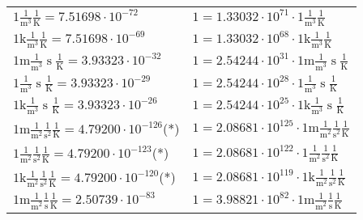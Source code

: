 \begin{center}
\begin{longtable}{l l}
{\color{black}$1 \bm{\mathrm{ }}\frac1{\operatorname{m}^3}{}{}\frac1{\operatorname{K}} = 7.51698\cdot10^{-72} $}   & {\color{black}$ 1 = 1.33032\cdot10^{71} \cdot 1 \bm{\mathrm{ }}\frac1{\operatorname{m}^3}{}{}\frac1{\operatorname{K}}$}  \\
{\color{gray}$1 \bm{\mathrm{ k}}\frac1{\operatorname{m}^3}{}{}\frac1{\operatorname{K}} = 7.51698\cdot10^{-69} $}   & {\color{gray}$ 1 = 1.33032\cdot10^{68} \cdot 1 \bm{\mathrm{ k}}\frac1{\operatorname{m}^3}{}{}\frac1{\operatorname{K}}$}  \\
{\color{gray}$1 \bm{\mathrm{ m}}\frac1{\operatorname{m}^3}{\operatorname{s}}{}\frac1{\operatorname{K}} = 3.93323\cdot10^{-32} $}   & {\color{gray}$ 1 = 2.54244\cdot10^{31} \cdot 1 \bm{\mathrm{ m}}\frac1{\operatorname{m}^3}{\operatorname{s}}{}\frac1{\operatorname{K}}$}  \\
{\color{black}$1 \bm{\mathrm{ }}\frac1{\operatorname{m}^3}{\operatorname{s}}{}\frac1{\operatorname{K}} = 3.93323\cdot10^{-29} $}   & {\color{black}$ 1 = 2.54244\cdot10^{28} \cdot 1 \bm{\mathrm{ }}\frac1{\operatorname{m}^3}{\operatorname{s}}{}\frac1{\operatorname{K}}$}  \\
{\color{gray}$1 \bm{\mathrm{ k}}\frac1{\operatorname{m}^3}{\operatorname{s}}{}\frac1{\operatorname{K}} = 3.93323\cdot10^{-26} $}   & {\color{gray}$ 1 = 2.54244\cdot10^{25} \cdot 1 \bm{\mathrm{ k}}\frac1{\operatorname{m}^3}{\operatorname{s}}{}\frac1{\operatorname{K}}$}  \\
{\color{gray}$1 \bm{\mathrm{ m}}\frac1{\operatorname{m}^2}\frac1{\operatorname{s}^2}{}\frac1{\operatorname{K}} = 4.79200\cdot10^{-126} $}\quad(*) & {\color{gray}$ 1 = 2.08681\cdot10^{125} \cdot 1 \bm{\mathrm{ m}}\frac1{\operatorname{m}^2}\frac1{\operatorname{s}^2}{}\frac1{\operatorname{K}}$}  \\
{\color{black}$1 \bm{\mathrm{ }}\frac1{\operatorname{m}^2}\frac1{\operatorname{s}^2}{}\frac1{\operatorname{K}} = 4.79200\cdot10^{-123} $}\quad(*) & {\color{black}$ 1 = 2.08681\cdot10^{122} \cdot 1 \bm{\mathrm{ }}\frac1{\operatorname{m}^2}\frac1{\operatorname{s}^2}{}\frac1{\operatorname{K}}$}  \\
{\color{gray}$1 \bm{\mathrm{ k}}\frac1{\operatorname{m}^2}\frac1{\operatorname{s}^2}{}\frac1{\operatorname{K}} = 4.79200\cdot10^{-120} $}\quad(*) & {\color{gray}$ 1 = 2.08681\cdot10^{119} \cdot 1 \bm{\mathrm{ k}}\frac1{\operatorname{m}^2}\frac1{\operatorname{s}^2}{}\frac1{\operatorname{K}}$}  \\
{\color{gray}$1 \bm{\mathrm{ m}}\frac1{\operatorname{m}^2}\frac1{\operatorname{s}}{}\frac1{\operatorname{K}} = 2.50739\cdot10^{-83} $}   & {\color{gray}$ 1 = 3.98821\cdot10^{82} \cdot 1 \bm{\mathrm{ m}}\frac1{\operatorname{m}^2}\frac1{\operatorname{s}}{}\frac1{\operatorname{K}}$}  \\

\end{longtable}
\end{center}

